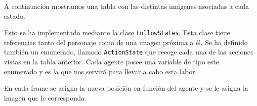 \clearpage
A continuación mostramos una tabla con las distintas imágenes asociadas a cada estado.

\begin{table}[H]
    \centering
    \newcommand{\ActionStatesPath}{../IA_Juegos/Assets/Textures/UI/Resources}
    \caption{Leyenda de acciones}
    \label{tab:actionStates}
\end{table}

Esto se ha implementado mediante la clase \texttt{FollowStates}. Esta clase tiene referencias tanto del personaje como de una imagen próxima a él. Se ha definido también un enumerado, llamado \texttt{ActionState} que recoge cada una de las acciones vistas en la tabla anterior. Cada agente posee una variable de tipo este enumerado y es la que nos servirá para llevar a cabo esta labor.



En cada frame se asigna la nueva posición en función del agente y se le asigna la imagen que le corresponda. 


